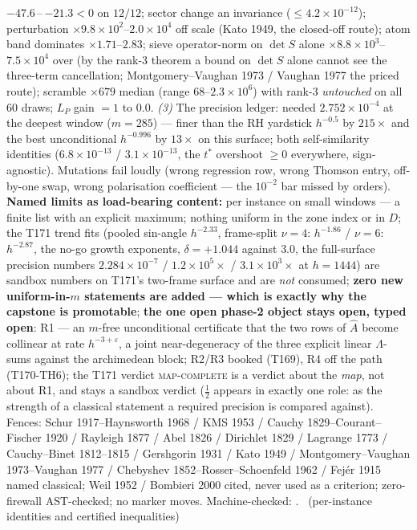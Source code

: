 \documentclass[11pt,a4paper]{article}
\begin{document}
$-47.6$\,--\,$-21.3<0$ on $12/12$; sector change an invariance
($\le4.2\times10^{-12}$); perturbation $\times9.8\times10^{2}$--$2.0
\times10^{4}$ off scale (Kato 1949, the closed-off route); atom band
dominates $\times1.71$--$2.83$; sieve operator-norm on $\det S$ alone
$\times8.8\times10^{3}$--$7.5\times10^{4}$ over (by the rank-3 theorem
a bound on $\det S$ alone cannot see the three-term cancellation;
Montgomery--Vaughan 1973 / Vaughan 1977 the priced route); scramble
$\times679$ median (range $68$--$2.3\times10^{6}$) with rank-3
\emph{untouched} on all $60$ draws; $L_P$ gain $=1$ to $0.0$.
\emph{(3)} The precision ledger: needed $2.752\times10^{-4}$ at the
deepest window ($m=285$) --- finer than the RH yardstick $h^{-0.5}$ by
$215\times$ and the best unconditional $h^{-0.996}$ by $13\times$ on
this surface; both self-similarity identities ($6.8\times10^{-13}$ /
$3.1\times10^{-13}$, the $t^*$ overshoot $\ge0$ everywhere,
sign-agnostic). Mutations fail loudly (wrong regression row, wrong
Thomson entry, off-by-one swap, wrong polarisation coefficient ---
the $10^{-2}$ bar missed by orders).
\textbf{Named limits as load-bearing content:} per instance on small
windows --- a finite list with an explicit maximum; nothing uniform in
the zone index or in $D$; the T171 trend fits (pooled sin-angle
$h^{-2.33}$, frame-split $\nu=4$: $h^{-1.86}$ / $\nu=6$: $h^{-2.87}$,
the no-go growth exponents, $\delta=+1.044$ against $3.0$, the
full-surface precision numbers $2.284\times10^{-7}$ /
$1.2\times10^{5}\times$ / $3.1\times10^{3}\times$ at $h=1444$) are
sandbox numbers on T171's two-frame surface and are \emph{not}
consumed; \textbf{zero new uniform-in-$m$ statements are added ---
which is exactly why the capstone is promotable}; \textbf{the one open
phase-2 object stays open, typed open}: R1 --- an $m$-free
unconditional certificate that the two rows of $\hat A$ become
collinear at rate $h^{-3+\varepsilon}$, a joint near-degeneracy of the
three explicit linear $\Lambda$-sums against the archimedean block;
R2/R3 booked (T169), R4 off the path (T170-TH6); the T171 verdict
\textsc{map-complete} is a verdict about the \emph{map}, not about R1,
and stays a sandbox verdict ($\tfrac12$ appears in exactly one role:
as the strength of a classical statement a required precision is
compared against).
Fences: Schur 1917--Haynsworth 1968 / KMS 1953 / Cauchy
1829--Courant--Fischer 1920 / Rayleigh 1877 / Abel 1826 / Dirichlet
1829 / Lagrange 1773 / Cauchy--Binet 1812--1815 / Gershgorin 1931 /
Kato 1949 / Montgomery--Vaughan 1973--Vaughan 1977 / Chebyshev
1852--Rosser--Schoenfeld 1962 / Fej\'er 1915 named classical; Weil
1952 / Bombieri 2000 cited, never used as a criterion; zero-firewall
AST-checked; no marker moves.
Machine-checked: .
\mE\ (per-instance identities and certified inequalities)
\end{document}

